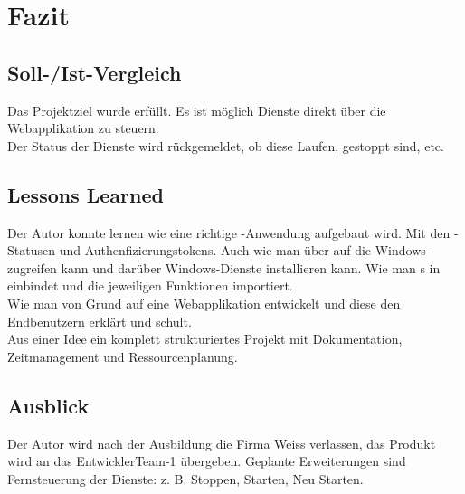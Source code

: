 \section{Fazit} 
\label{sec:Fazit}

\subsection{Soll-/Ist-Vergleich}
\label{sec:SollIstVergleich}

Das Projektziel wurde erfüllt. Es ist möglich Dienste direkt über die Webapplikation zu steuern. \\
Der Status der Dienste wird rückgemeldet, ob diese Laufen, gestoppt sind, etc.


\subsection{Lessons Learned}
\label{sec:LessonsLearned}

Der Autor konnte lernen wie eine richtige -Anwendung aufgebaut wird. Mit den -Statusen und Authenfizierungstokens. Auch wie man über  auf die Windows- zugreifen kann und darüber Windows-Dienste installieren kann. Wie man s in  einbindet und die jeweiligen Funktionen importiert. \\
Wie man von Grund auf eine Webapplikation entwickelt und diese den Endbenutzern erklärt und schult. \\
Aus einer Idee ein komplett strukturiertes Projekt mit Dokumentation, Zeitmanagement und Ressourcenplanung.


\subsection{Ausblick}
\label{sec:Ausblick}
Der Autor wird nach der Ausbildung die Firma Weiss verlassen, das Produkt wird an das EntwicklerTeam-1 übergeben.
Geplante Erweiterungen sind Fernsteuerung der Dienste: z. B. Stoppen, Starten, Neu Starten.
